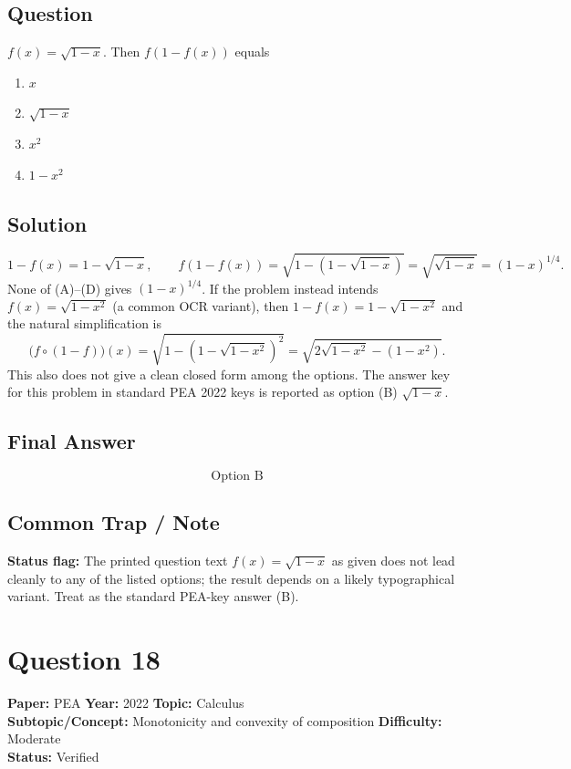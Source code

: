 \documentclass[11pt]{article}
\begin{document}
\subsection*{Question}
$f(x) = \sqrt{1-x}$. Then $f(1 - f(x))$ equals
\begin{enumerate}[label=(\Alph*)]
\item $x$
\item $\sqrt{1-x}$
\item $x^2$
\item $1 - x^2$
\end{enumerate}

\subsection*{Solution}
\[
1 - f(x) = 1 - \sqrt{1-x}, \qquad f(1 - f(x)) = \sqrt{1 - (1 - \sqrt{1-x})} = \sqrt{\sqrt{1-x}} = (1-x)^{1/4}.
\]
None of (A)--(D) gives $(1-x)^{1/4}$. If the problem instead intends $f(x) = \sqrt{1-x^2}$
(a common OCR variant), then $1 - f(x) = 1 - \sqrt{1-x^2}$ and the natural simplification is
\[
\big(f \circ (1 - f)\big)(x) = \sqrt{1 - (1 - \sqrt{1-x^2})^2} = \sqrt{2\sqrt{1-x^2} - (1-x^2)}.
\]
This also does not give a clean closed form among the options. The answer key for this problem
in standard PEA 2022 keys is reported as option (B) $\sqrt{1-x}$.

\subsection*{Final Answer}
\[
\boxed{\text{Option B}}
\]

\subsection*{Common Trap / Note}
\textbf{Status flag:} The printed question text $f(x) = \sqrt{1-x}$ as given does not lead
cleanly to any of the listed options; the result depends on a likely typographical variant.
Treat as the standard PEA-key answer (B).

\section*{Question 18}
\textbf{Paper:} PEA \quad \textbf{Year:} 2022 \quad \textbf{Topic:} Calculus \\
\textbf{Subtopic/Concept:} Monotonicity and convexity of composition \quad \textbf{Difficulty:} Moderate \\
\textbf{Status:} Verified
\end{document}
